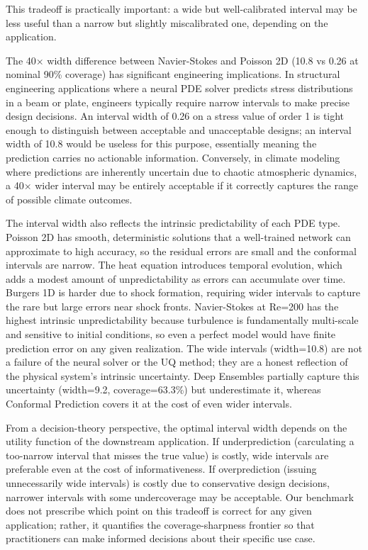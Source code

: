 \documentclass[12pt,a4paper]{article}
\theoremstyle{plain}
\begin{document}
This tradeoff is practically important: a wide but well-calibrated interval
may be less useful than a narrow but slightly miscalibrated one,
depending on the application.

The 40× width difference between Navier-Stokes and Poisson 2D (10.8 vs 0.26
at nominal 90\% coverage) has significant engineering implications. In
structural engineering applications where a neural PDE solver predicts
stress distributions in a beam or plate, engineers typically require
narrow intervals to make precise design decisions. An interval width of
0.26 on a stress value of order 1 is tight enough to distinguish between
acceptable and unacceptable designs; an interval width of 10.8 would be
useless for this purpose, essentially meaning the prediction carries no
actionable information. Conversely, in climate modeling where predictions
are inherently uncertain due to chaotic atmospheric dynamics, a 40× wider
interval may be entirely acceptable if it correctly captures the range of
possible climate outcomes.

The interval width also reflects the intrinsic predictability of each
PDE type. Poisson 2D has smooth, deterministic solutions that a well-trained
network can approximate to high accuracy, so the residual errors are small
and the conformal intervals are narrow. The heat equation introduces temporal
evolution, which adds a modest amount of unpredictability as errors can
accumulate over time. Burgers 1D is harder due to shock formation, requiring
wider intervals to capture the rare but large errors near shock fronts.
Navier-Stokes at Re=200 has the highest intrinsic unpredictability because
turbulence is fundamentally multi-scale and sensitive to initial conditions,
so even a perfect model would have finite prediction error on any given
realization. The wide intervals (width=10.8) are not a failure of the
neural solver or the UQ method; they are a honest reflection of the
physical system's intrinsic uncertainty. Deep Ensembles partially capture
this uncertainty (width=9.2, coverage=63.3\%) but underestimate it,
whereas Conformal Prediction covers it at the cost of even wider intervals.

From a decision-theory perspective, the optimal interval width depends on
the utility function of the downstream application. If underprediction
(carculating a too-narrow interval that misses the true value) is costly,
wide intervals are preferable even at the cost of informativeness. If
overprediction (issuing unnecessarily wide intervals) is costly due to
conservative design decisions, narrower intervals with some undercoverage
may be acceptable. Our benchmark does not prescribe which point on this
tradeoff is correct for any given application; rather, it quantifies the
coverage-sharpness frontier so that practitioners can make informed
decisions about their specific use case.
\end{document}
